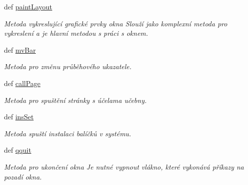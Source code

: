 \begin{DoxyCompactItemize}
def \hyperlink{classmnFocus_1_1App_a600fc232b0400302e1f235e1e1b463f7}{paint\-Layout}
\begin{DoxyCompactList}\small\item\em Metoda vykreslující grafické prvky okna Slouží jako komplexní metoda pro vykreslení a je hlavní metodou s práci s oknem. \end{DoxyCompactList}\item 
def \hyperlink{classmnFocus_1_1App_abeafb220b3de369f9c53303aee0021b5}{mv\-Bar}
\begin{DoxyCompactList}\small\item\em Metoda pro změnu průběhového ukazatele. \end{DoxyCompactList}\item 
def \hyperlink{classmnFocus_1_1App_aee9420a407130cec034afb6d5c32278c}{call\-Page}
\begin{DoxyCompactList}\small\item\em Metoda pro spuštění stránky s účelama učebny. \end{DoxyCompactList}\item 
def \hyperlink{classmnFocus_1_1App_a2ad6e7b25e3ebd9dbf284a5046ed22d0}{ins\-Set}
\begin{DoxyCompactList}\small\item\em Metoda spuští instalaci balíčků v systému. \end{DoxyCompactList}\item 
def \hyperlink{classmnFocus_1_1App_af8116e51713d83edb9b3d91cf4449329}{qquit}
\begin{DoxyCompactList}\small\item\em Metoda pro ukončení okna Je nutné vypnout vlákno, které vykonává příkazy na pozadí okna. \end{DoxyCompactList}\end{DoxyCompactItemize}
